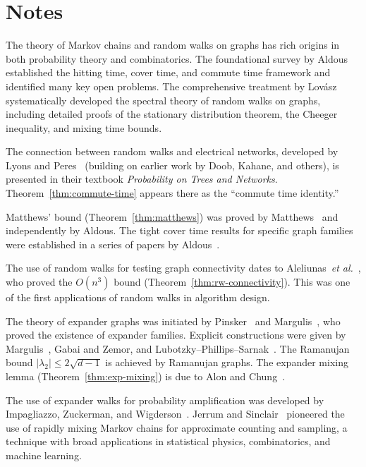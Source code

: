 \documentclass[twoside,12pt]{book}
\theoremstyle{plain}
\theoremstyle{definition}
\theoremstyle{remark}
\begin{document}
\section*{Notes}

The theory of Markov chains and random walks on graphs has rich origins
in both probability theory and combinatorics. The foundational survey by
Aldous~\cite{Aldous1983} established the hitting time, cover time, and
commute time framework and identified many key open problems. The
comprehensive treatment by Lov\'{a}sz~\cite{Lovasz1993} systematically
developed the spectral theory of random walks on graphs, including
detailed proofs of the stationary distribution theorem, the Cheeger
inequality, and mixing time bounds.

The connection between random walks and electrical networks, developed by
Lyons and Peres~\cite{LyonsPeres2016} (building on earlier work by
Doob, Kahane, and others), is presented in their textbook \emph{Probability
on Trees and Networks}. Theorem~\ref{thm:commute-time} appears there as
the ``commute time identity.''

Matthews' bound (Theorem~\ref{thm:matthews}) was proved by
Matthews~\cite{Matthews1988} and independently by Aldous. The tight
cover time results for specific graph families were established in a
series of papers by Aldous~\cite{Aldous1989, Aldous1991}.

The use of random walks for testing graph connectivity dates to
Aleliunas~\emph{et al.}~\cite{AleliunasEtAl1979}, who proved the
$O(n^3)$ bound (Theorem~\ref{thm:rw-connectivity}). This was one of the
first applications of random walks in algorithm design.

The theory of expander graphs was initiated by Pinsker~\cite{Pinsker1973}
and Margulis~\cite{Margulis1973}, who proved the existence of expander
families. Explicit constructions were given by
Margulis~\cite{Margulis1988}, Gabai and Zemor, and
Lubotzky--Phillips--Sarnak~\cite{LubotzkyEtAl1988}. The Ramanujan
bound $|\lambda_2| \leq 2\sqrt{d-1}$ is achieved by Ramanujan graphs.
The expander mixing lemma (Theorem~\ref{thm:exp-mixing}) is due to
Alon and Chung~\cite{AlonChung1988}.

The use of expander walks for probability amplification was developed by
Impagliazzo, Zuckerman, and Wigderson~\cite{ImpagliazzoEtAl1995}.
Jerrum and Sinclair~\cite{JerrumSinclair1996} pioneered the use of
rapidly mixing Markov chains for approximate counting and sampling, a
technique with broad applications in statistical physics, combinatorics,
and machine learning.
\end{document}
